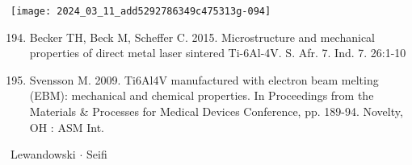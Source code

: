 \documentclass[10pt]{article}
\begin{document}
\begin{center}
\texttt{[image: 2024\_03\_11\_add5292786349c475313g-094]}
\end{center}

\begin{enumerate}
  \setcounter{enumi}{193}
  \item Becker TH, Beck M, Scheffer C. 2015. Microstructure and mechanical properties of direct metal laser sintered Ti-6Al-4V. S. Afr. 7. Ind. 7. 26:1-10

  \item Svensson M. 2009. Ti6Al4V manufactured with electron beam melting (EBM): mechanical and chemical properties. In Proceedings from the Materials \& Processes for Medical Devices Conference, pp. 189-94. Novelty, $\mathrm{OH}$ : ASM Int.

\end{enumerate}

Lewandowski $\cdot$ Seifi
\end{document}
